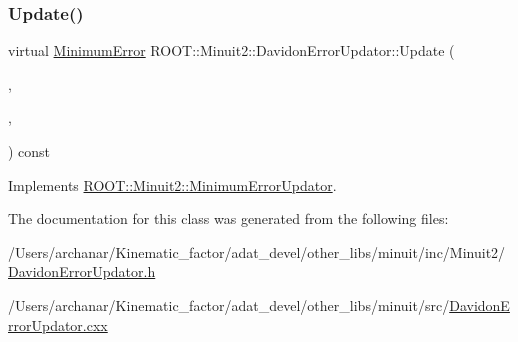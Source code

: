 \subsubsection{\texorpdfstring{Update()}{Update()}\hspace{0.1cm}{\footnotesize\ttfamily [2/2]}}
{\footnotesize\ttfamily virtual \mbox{\hyperlink{classROOT_1_1Minuit2_1_1MinimumError}{Minimum\+Error}} R\+O\+O\+T\+::\+Minuit2\+::\+Davidon\+Error\+Updator\+::\+Update (\begin{DoxyParamCaption}\item[{const \mbox{\hyperlink{classROOT_1_1Minuit2_1_1MinimumState}{Minimum\+State}} \&}]{,  }\item[{const \mbox{\hyperlink{classROOT_1_1Minuit2_1_1MinimumParameters}{Minimum\+Parameters}} \&}]{,  }\item[{const \mbox{\hyperlink{classROOT_1_1Minuit2_1_1FunctionGradient}{Function\+Gradient}} \&}]{ }\end{DoxyParamCaption}) const\hspace{0.3cm}{\ttfamily [virtual]}}



Implements \mbox{\hyperlink{classROOT_1_1Minuit2_1_1MinimumErrorUpdator_ae75c33152c49ebf34e6119adc0bbbda9}{R\+O\+O\+T\+::\+Minuit2\+::\+Minimum\+Error\+Updator}}.



The documentation for this class was generated from the following files\+:\begin{DoxyCompactItemize}
\item 
/\+Users/archanar/\+Kinematic\+\_\+factor/adat\+\_\+devel/other\+\_\+libs/minuit/inc/\+Minuit2/\mbox{\hyperlink{other__libs_2minuit_2inc_2Minuit2_2DavidonErrorUpdator_8h}{Davidon\+Error\+Updator.\+h}}\item 
/\+Users/archanar/\+Kinematic\+\_\+factor/adat\+\_\+devel/other\+\_\+libs/minuit/src/\mbox{\hyperlink{DavidonErrorUpdator_8cxx}{Davidon\+Error\+Updator.\+cxx}}\end{DoxyCompactItemize}
